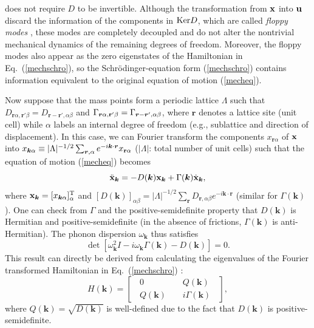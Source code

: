 \documentclass{tADP2e}
\theoremstyle{plain}
\theoremstyle{plain}
\theoremstyle{definition}
\begin{document}
does not require $D$ to be invertible. Although the transformation from $\bold{x}$ into $\bold{u}$ discard the information of the components in ${\rm Ker}D$, which are called \emph{floppy modes} \cite{KCL14}, these modes are completely decoupled and do not alter the nontrivial mechanical dynamics of the remaining degrees of freedom. Moreover, the floppy modes also appear as the zero eigenstates of the Hamiltonian in Eq.~(\ref{mechschro}),  so the Schr\"odinger-equation form (\ref{mechschro}) contains information equivalent to the original equation of motion (\ref{mecheq}).


Now suppose that the mass points form a periodic lattice $\Lambda$ such that $D_{\boldsymbol{r}\alpha,\boldsymbol{r}'\beta}=D_{\boldsymbol{r}-\boldsymbol{r}',\alpha\beta}$ and $\Gamma_{\boldsymbol{r}\alpha,\bold{r}'\beta}=\Gamma_{\boldsymbol{r}-\boldsymbol{r}',\alpha\beta}$, where $\boldsymbol{r}$ denotes a lattice site (unit cell) while $\alpha$ labels an internal degree of freedom (e.g., sublattice and direction of displacement). In this case, we can Fourier transform 
the components $x_{\boldsymbol{r}\alpha}$ of $\bold{x}$ into $x_{\boldsymbol{k}\alpha}\equiv|\Lambda|^{-1/2}\sum_{\boldsymbol{r},\alpha}e^{-i\boldsymbol{k}\cdot\boldsymbol{r}}x_{\bold{r}\alpha}$ ($|\Lambda|$: total number of unit cells) such that the equation of motion (\ref{mecheq}) becomes
\begin{equation}
\ddot{\bold{x}}_{\boldsymbol{k}}=-D(\boldsymbol{k})\bold{x}_{\boldsymbol{k}}+\Gamma(\boldsymbol{k})\dot{\bold{x}}_{\boldsymbol{k}},
\end{equation}
where $\bold{x}_{\boldsymbol{k}}=[x_{\boldsymbol{k}\alpha}]^{\rm T}_\alpha$ and $[D(\boldsymbol{k})]_{\alpha\beta}=|\Lambda|^{-1/2}\sum_{\boldsymbol{r}}D_{\boldsymbol{r},\alpha\beta}e^{-i\boldsymbol{k}\cdot\boldsymbol{r}}$ (similar for $\Gamma(\boldsymbol{k})$). One can check from $\Gamma$ and the positive-semidefinite property that $D(\boldsymbol{k})$ is Hermitian and positive-semidefinite (in the absence of frictions, $\Gamma(\boldsymbol{k})$ is anti-Hermitian). The phonon dispersion $\omega_{\boldsymbol{k}}$ thus satisfies \cite{YTW15,KT15}
\begin{equation}
\det[\omega_{\boldsymbol{k}}^2I-i\omega_{\boldsymbol{k}}\Gamma(\boldsymbol{k})-D(\boldsymbol{k})]=0.
\label{mechdet}
\end{equation}
This result can directly be derived from calculating the eigenvalues of the Fourier transformed Hamiltonian in Eq.~(\ref{mechschro}) \cite{SR16,YT19}:  
\begin{equation}
H(\boldsymbol{k})=\begin{bmatrix} \;\;0\;\; & \;\;Q(\boldsymbol{k})\;\; \\ \;\;Q(\boldsymbol{k})\;\; & \;\;i\Gamma(\boldsymbol{k})\;\; \end{bmatrix},
\label{mechHk}
\end{equation}
where $Q(\boldsymbol{k})=\sqrt{D(\boldsymbol{k})}$ is well-defined due to the fact that $D(\boldsymbol{k})$ is positive-semidefinite. 
\end{document}
